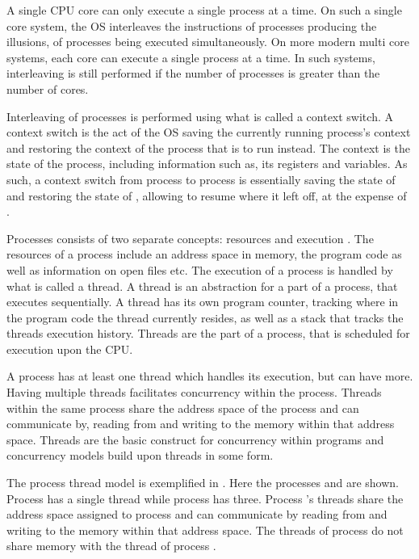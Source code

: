A single \ac{CPU} core can only execute a single process at a time. On such a single core system, the \ac{OS} interleaves the instructions of processes producing the illusions, of processes being executed simultaneously\cite[p. 16]{bryant2011computer}. On more modern multi core systems, each core can execute a single process at a time. In such systems, interleaving is still performed if the number of processes is greater than the number of cores.

Interleaving of processes is performed using what is called a context switch\cite[p. 16]{bryant2011computer}. A context switch is the act of the \ac{OS} saving the currently running process's context and restoring the context of the process that is to run instead. The context is the state of the process, including information such as, its registers and variables\cite[p. 82]{tanenbaum2008modern}. As such, a context switch from process  to process  is essentially saving the state of  and restoring the state of , allowing  to resume where it left off, at the expense of .

Processes consists of two separate concepts: resources and execution \cite[p. 98]{tanenbaum2008modern}. The resources of a process include an address space in memory, the program code as well as information on open files etc. The execution of a process is handled by what is called a thread\cite[p. 98]{tanenbaum2008modern}. A thread is an abstraction for a part of a process, that executes sequentially. A thread has its own program counter, tracking where in the program code the thread currently resides, as well as a stack that tracks the threads execution history\cite[p. 99]{tanenbaum2008modern}. Threads are the part of a process, that is scheduled for execution upon the \ac{CPU}.

A process has at least one thread which handles its execution, but can have more. Having multiple threads facilitates concurrency within the process. Threads within the same process share the address space of the process and can communicate by, reading from and writing to the memory within that address space. Threads are the basic construct for concurrency within programs and concurrency models build upon threads in some form.

The process thread model is exemplified in . Here the processes  and  are shown. Process  has a single thread while process  has three. Process 's threads share the address space assigned to process  and can communicate by reading from and writing to the memory within that address space. The threads of process  do not share memory with the thread of process .

